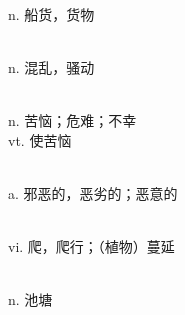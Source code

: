 \documentclass[b5paper, 11pt]{ctexart}
\begin{document}
\begin{multicols*}{2}
\begin{description}[leftmargin=0.5cm]
\item[cargo] \hfill \\ n. 船货，货物

\item[turmoil] \hfill \\ n. 混乱，骚动

\item[distress] \hfill \\ n. 苦恼；危难；不幸 \\ vt. 使苦恼

\item[wicked] \hfill \\ a. 邪恶的，恶劣的；恶意的

\item[creep] \hfill \\ vi. 爬，爬行；（植物）蔓延

\item[pond] \hfill \\ n. 池塘

    \end{description}
\end{multicols*}

\clearpage
\end{document}

